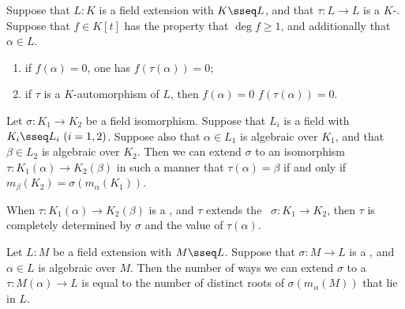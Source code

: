 \documentclass[a4paper]{article}
\begin{document}
\begin{tlemma}
  Suppose that $ L:K $ is a field extension with $ K\sseq L $, and that $ \tau:L\to L $ is a $ K $-\homo .
  Suppose that $ f\in K[t] $ has the property that $ \deg f \geq 1 $, and additionally that $ \alpha\in L $.
  \begin{enumerate}[label=(\roman*)]
    \item if $ f(\alpha) = 0 $, one has $ f(\tau(\alpha)) = 0 $;
    \item if $ \tau $ is a $ K $-automorphism of $ L $, then $ f(\alpha) = 0 $ \iff $ f(\tau(\alpha)) = 0 $.
  \end{enumerate}
\end{tlemma}

\begin{ttheorem}
  Let $ \sigma :K_1\to K_2 $ be a field isomorphism.
  Suppose that $ L_i $ is a field with $ K_i\sseq L_i\ (i=1,2) $.
  Suppose also that $ \alpha\in L_1 $ is algebraic over $ K_1 $, and that $ \beta\in L_2 $ is algebraic over $ K_2 $.
  Then we can extend $ \sigma $ to an isomorphism $ \tau:K_1(\alpha)\to K_2(\beta) $ in such a manner that $ \tau(\alpha) = \beta $ if and only if $ m_\beta(K_2) = \sigma(m_\alpha(K_1)) $.
  \begin{center}
  \end{center}
\end{ttheorem}

\quad When $ \tau:K_1(\alpha)\to K_2(\beta) $ is a \homo, and $ \tau $ extends the \homo~$ \sigma:K_1\to K_2 $, then $ \tau $ is completely determined by $ \sigma $ and the value of $ \tau(\alpha) $.

\begin{tcorollary}
  Let $ L:M $ be a field extension with $ M\sseq L $. Suppose that $ \sigma:M\to L $ is a \homo, and $ \alpha\in L $ is algebraic over $ M $.
  Then the number of ways we can extend $ \sigma $ to a \homo~$ \tau:M(\alpha)\to L $ is equal to the number of distinct roots of $ \sigma(m_\alpha(M)) $ that lie in $ L $.
\end{tcorollary}
\end{document}

